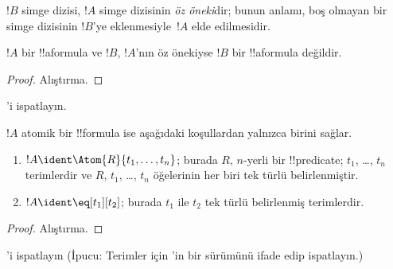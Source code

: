 \begin{defn}[Öz önek]
$!B$ simge dizisi, $!A$ simge dizisinin \emph{öz öneki}dir; bunun
anlamı, boş olmayan bir simge dizisinin $!B$'ye eklenmesiyle~$!A$ elde
edilmesidir.
\end{defn}

\begin{lem}
$!A$ bir !!a{formula} ve $!B$, $!A$'nın öz önekiyse $!B$ bir
!!a{formula} değildir.
\end{lem}

\begin{proof}
Alıştırma.
\end{proof}

\begin{prob}
'i ispatlayın.
\end{prob}

\begin{prop}
$!A$ atomik bir !!{formula} ise aşağıdaki koşullardan yalnızca birini
sağlar.
\begin{enumerate}
\item $!A \ident \Atom{R}{t_1,\dots,t_n}$; burada $R$, $n$-yerli bir
  !!{predicate}; $t_1$, \dots, $t_n$ terimlerdir ve $R$,
  $t_1$, \dots, $t_n$ öğelerinin her biri tek türlü belirlenmiştir.
\item $!A \ident \eq[t_1][t_2]$; burada $t_1$ ile $t_2$ tek türlü
  belirlenmiş terimlerdir.
\end{enumerate}
\end{prop}

\begin{proof}
Alıştırma.
\end{proof}

\begin{prob}
'i ispatlayın (İpucu: Terimler
için 'in bir sürümünü ifade edip
ispatlayın.)
\end{prob}

